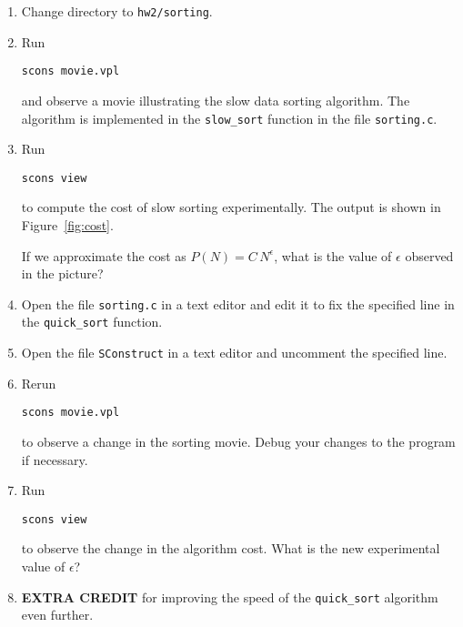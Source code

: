 \begin{enumerate}          
\item Change directory to \texttt{hw2/sorting}.
\item Run
\begin{verbatim}
scons movie.vpl
\end{verbatim}
and observe a movie illustrating the slow data sorting algorithm. The
algorithm is implemented in the \texttt{slow\_sort} function in the
file \texttt{sorting.c}.

\item Run
\begin{verbatim}
scons view
\end{verbatim}
to compute the cost of slow sorting experimentally. The output is
shown in Figure~\ref{fig:cost}.


If we approximate the cost as $P(N)=C\,N^\epsilon$, what is the value of
$\epsilon$ observed in the picture?

\item Open the file \texttt{sorting.c} in a text editor and edit it to 
fix the specified line in the \texttt{quick\_sort} function.

\item Open the file \texttt{SConstruct} in a text editor and uncomment 
      the specified line.

\item Rerun
\begin{verbatim}
scons movie.vpl
\end{verbatim}
to observe a change in the sorting movie. Debug your changes to the
program if necessary.

\item Run
\begin{verbatim}
scons view
\end{verbatim}
to observe the change in the algorithm cost. What is the new
experimental value of $\epsilon$?

\item \textbf{EXTRA CREDIT} for improving the speed of the 
\texttt{quick\_sort} algorithm even further.
\end{enumerate}

\lstset{language=c,numbers=left,numberstyle=\tiny,showstringspaces=false}


